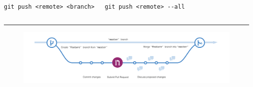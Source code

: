 \documentclass{beamer}
\newcommand\crule[3][black]{\textcolor{#1}{\rule{#2}{#3}}}
\begin{document}
\begin{frame}
  \begin{columns}
    \resizebox{\textwidth}{!}{\FiraTitle \color{green}{Push}}
    \vspace{1em}
    
    {\FiraTitle \lstinline|git push <remote> <branch>|}

    {\FiraTitle \lstinline|git push <remote> --all|}

    {\FiraTitle \color{red}{\lstinline|git push <remote> --force|}}
  \end{columns}
  \vspace{2em}

  \crule[green]{1.2\textwidth}{3em}
\end{frame}

\begin{frame}
  \begin{figure}
    \centering
    \resizebox{0.7\textwidth}{!}{\FiraTitle \color{purple}{Github Flow}}
    \vspace{2em}
    
    \includegraphics[width=\textwidth]{flow}
  \end{figure}
\end{frame}

\begin{frame}
  \resizebox{0.7\textwidth}{!}{\FiraTitle \color{green}{¿}\color{purple}{Pre}}
  
  \resizebox{0.6\textwidth}{!}{\FiraTitle \color{purple}{gun}}
  
  \resizebox{0.6\textwidth}{!}{\FiraTitle \color{purple}{tas}\color{green}{?}}
\end{frame}
\end{document}
